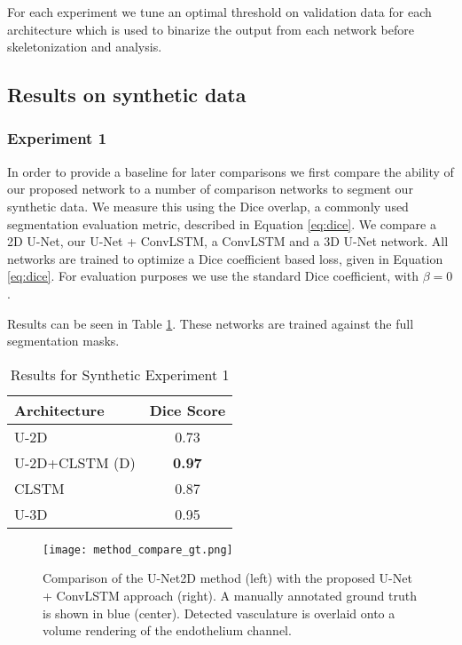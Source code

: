 \documentclass[journal,transmag]{IEEEtran}
\begin{document}
For each experiment we tune an optimal threshold on validation data for each architecture which is used to binarize the output from each network before skeletonization and analysis.

\subsection{Results on synthetic data}

\subsubsection*{Experiment 1}
In order to provide a baseline for later comparisons we first compare the ability of our proposed network to a number of comparison networks to segment our synthetic data. We measure this using the Dice overlap, a commonly used segmentation evaluation metric, described in Equation \ref{eq:dice}. We compare a 2D U-Net, our U-Net + ConvLSTM, a ConvLSTM and a 3D U-Net network. All networks are trained to optimize a Dice coefficient based loss, given in Equation \ref{eq:dice}. For evaluation purposes we use the standard Dice coefficient, with $\beta = 0$.

Results can be seen in Table \ref{tab:synth_seg_dice}. These networks are trained against the full segmentation masks.

\begin{table}[h]
\centering
\begin{tabular}{l|c}
Architecture & Dice Score  \\
\hline
                U-2D & 0.73 \\
                U-2D+CLSTM (D)& \textbf{0.97} \\
                CLSTM & 0.87  \\
                U-3D &  0.95  \\
\end{tabular}
\caption{Results for Synthetic Experiment 1}
\label{tab:synth_seg_dice}
\end{table}

\begin{figure*}[t]
\texttt{[image: method\_compare\_gt.png]}
\caption{Comparison of the U-Net2D method (left) with the proposed U-Net + ConvLSTM approach (right). A manually annotated ground truth is shown in blue (center). Detected vasculature is overlaid onto a volume rendering of the endothelium channel.}
\label{fig:results_compare}
\end{figure*}
\end{document}
